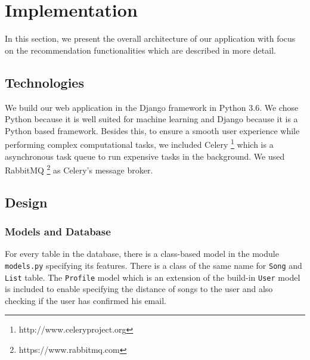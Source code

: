 \section{Implementation}
In this section, we present the overall architecture of our application with focus on the recommendation functionalities which are described in more detail. 
\subsection{Technologies}

We build our web application in the Django framework in Python 3.6. We chose Python because it is well suited for machine learning and Django because it is a Python based framework. Besides this, to ensure a smooth user experience while performing complex computational tasks, we included Celery \footnote{http://www.celeryproject.org} which is a asynchronous task queue to run expensive tasks in the background. We used RabbitMQ \footnote{https://www.rabbitmq.com} as Celery's message broker.

\subsection{Design}

\subsubsection{Models and Database}
For every table in the database, there is a class-based model in the module \texttt{models.py} specifying its features. There is a class of the same name for \texttt{Song} and \texttt{List} table. The \texttt{Profile} model which is an extension of the build-in \texttt{User} model is included to enable specifying the distance of songs to the user and also checking if the user has confirmed his email.\\
 
